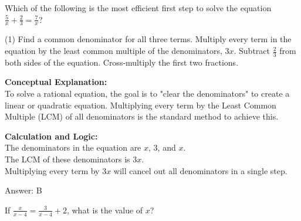 \documentclass[11pt,paper=a4,answers]{exam}
\begin{document}
\begin{questions}
\pointsinrightmargin
\pointsdroppedatright
\marksnotpoints
{}
\pointformat{\boldmath\themarginpoints}
\bracketedpoints




\question
Which of the following is the most efficient first step to solve the equation $\frac{5}{x} + \frac{2}{3} = \frac{7}{x}$?
\begin{tasks}(1)
    \task Find a common denominator for all three terms.
    \task Multiply every term in the equation by the least common multiple of the denominators, $3x$.
    \task Subtract $\frac{2}{3}$ from both sides of the equation.
    \task Cross-multiply the first two fractions.
\end{tasks}

\begin{solution}
\textbf{Conceptual Explanation:} \\
To solve a rational equation, the goal is to "clear the denominators" to create a linear or quadratic equation. Multiplying every term by the Least Common Multiple (LCM) of all denominators is the standard method to achieve this.

\vspace{20pt}

\textbf{Calculation and Logic:} \\
The denominators in the equation are $x$, $3$, and $x$. \\
The LCM of these denominators is $3x$. \\
Multiplying every term by $3x$ will cancel out all denominators in a single step.

\vspace{25pt}

Answer: \colorbox{yellow!100}{B}
\end{solution}

\vspace{40pt}

\question
If $\frac{x}{x-4} = \frac{3}{x-4} + 2$, what is the value of $x$?


\end{questions}
\end{document}

